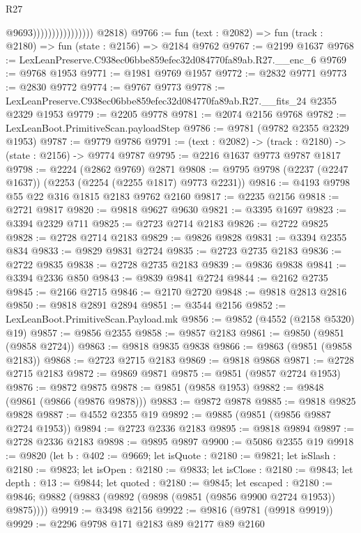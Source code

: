 \begin{lexlean}{R27}
\begin{coremodule}
                                      @9693))))))))))))))))
      @2818)
@9766 := fun (text : @2082) => fun (track : @2180) => fun (state : @2156) => @2184 @9762
@9767 := @2199 @1637
@9768 := LexLeanPreserve.C938ec06bbe859efec32d084770fa89ab.R27.__enc_6
@9769 := @9768 @1953
@9771 := @1981 @9769 @1957
@9772 := @2832 @9771
@9773 := @2830 @9772
@9774 := @9767 @9773
@9778 := LexLeanPreserve.C938ec06bbe859efec32d084770fa89ab.R27.__fits_24 @2355 @2329 @1953
@9779 := @2205 @9778
@9781 := @2074 @2156 @9768
@9782 := LexLeanBoot.PrimitiveScan.payloadStep
@9786 := @9781 (@9782 @2355 @2329 @1953)
@9787 := @9779 @9786
@9791 := (text : @2082) -> (track : @2180) -> (state : @2156) -> @9774 @9787
@9795 := @2216 @1637 @9773 @9787 @1817
@9798 := @2224 (@2862 @9769) @2871
@9808 := @9795 @9798 (@2237 (@2247 @1637)) (@2253 (@2254 (@2255 @1817) @9773 @2231))
@9816 := @4193 @9798 @55 @22 @316 @1815 @2183 @9762 @2160
@9817 := @2235 @2156
@9818 := @2721 @9817
@9820 := @9818 @9627 @9630
@9821 := @3395 @1697
@9823 := @3394 @2329 @711
@9825 := @2723 @2714 @2183
@9826 := @2722 @9825
@9828 := @2728 @2714 @2183
@9829 := @9826 @9828
@9831 := @3394 @2355 @834
@9833 := @9829 @9831 @2724
@9835 := @2723 @2735 @2183
@9836 := @2722 @9835
@9838 := @2728 @2735 @2183
@9839 := @9836 @9838
@9841 := @3394 @2336 @850
@9843 := @9839 @9841 @2724
@9844 := @2162 @2735
@9845 := @2166 @2715
@9846 := @2170 @2720
@9848 := @9818 @2813 @2816
@9850 := @9818 @2891 @2894
@9851 := @3544 @2156
@9852 := LexLeanBoot.PrimitiveScan.Payload.mk
@9856 := @9852 (@4552 (@2158 @5320) @19)
@9857 := @9856 @2355
@9858 := @9857 @2183
@9861 := @9850 (@9851 (@9858 @2724))
@9863 := @9818 @9835 @9838
@9866 := @9863 (@9851 (@9858 @2183))
@9868 := @2723 @2715 @2183
@9869 := @9818 @9868
@9871 := @2728 @2715 @2183
@9872 := @9869 @9871
@9875 := @9851 (@9857 @2724 @1953)
@9876 := @9872 @9875
@9878 := @9851 (@9858 @1953)
@9882 := @9848 (@9861 (@9866 (@9876 @9878)))
@9883 := @9872 @9878
@9885 := @9818 @9825 @9828
@9887 := @4552 @2355 @19
@9892 := @9885 (@9851 (@9856 @9887 @2724 @1953))
@9894 := @2723 @2336 @2183
@9895 := @9818 @9894
@9897 := @2728 @2336 @2183
@9898 := @9895 @9897
@9900 := @5086 @2355 @19
@9918 := @9820
    (let b : @402 := @9669;
    let isQuote : @2180 := @9821;
    let isSlash : @2180 := @9823;
    let isOpen : @2180 := @9833;
    let isClose : @2180 := @9843;
    let depth : @13 := @9844;
    let quoted : @2180 := @9845;
    let escaped : @2180 := @9846;
    @9882 (@9883 (@9892 (@9898 (@9851 (@9856 @9900 @2724 @1953)) @9875))))
@9919 := @3498 @2156
@9922 := @9816 (@9781 (@9918 @9919))
@9929 := @2296 @9798 @171 @2183 @89 @2177 @89 @2160

\end{coremodule}
\end{lexlean}
